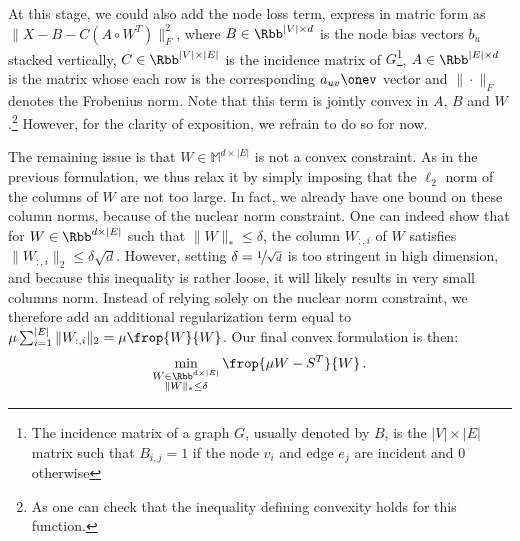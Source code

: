 At this stage, we could also add the node loss term, express in matric form as $\|X - B -
C\left(A\circ W^T \right)\|_F^2$, where $B\in \Rbb^{|V| \times d}$ is the node bias vectors $b_u$
stacked vertically, $C \in \Rbb^{|V| \times |E|}$ is the incidence matrix of $G$\footnote{The
  incidence matrix of a graph $G$, usually denoted by $B$, is the $|V| \times |E|$ matrix such that
$B_{i,j} = 1$ if the node $v_i$ and edge $e_j$ are incident and 0 otherwise}, $A \in \Rbb^{|E|
\times d}$ is the matrix whose each row is the corresponding $a_{uv}\onev$ vector and $\|\cdot\|_F$
denotes the Frobenius norm. Note that this term is jointly convex in $A$, $B$ and $W$.\footnote{As
one can check that the inequality defining convexity holds for this function.} However, for the
clarity of exposition, we refrain to do so for now.

The remaining issue is that $W\in \mathbb{M}^{d\times |E|}$ is not a convex constraint. As in the
previous formulation, we thus relax it by simply imposing that the $\ell_2$ norm of the columns of
$W$ are not too large. In fact, we already have one bound on these column norms, because of the
nuclear norm constraint. One can indeed show that for $W\in \Rbb^{d\times |E|}$ such that $\|W\|_*
\leq \delta$, the \ith{} column $W_{:,i}$ of $W$ satisfies $\|W_{:,i}\|_2 \leq \delta\sqrt{d}$.
However, setting $\delta = \nicefrac{1}{\sqrt{d}}$ is too stringent in high dimension, and because
this inequality is rather loose, it will likely results in very small columns norm. Instead of
relying solely on the nuclear norm constraint, we therefore add an additional regularization term
equal to $\mu \sum_{i=1}^{|E|} \|W_{:,i}\|_2 = \mu \frop{W}{W}$. Our final convex formulation is
then:
\begin{equation}
  \label{eq:edge_FW}
  \min_{\substack{W\in \Rbb^{d\times |E|} \\ \|W\|_* \leq \delta}} \frop{\mu W - S^T}{W} \,.
\end{equation}

